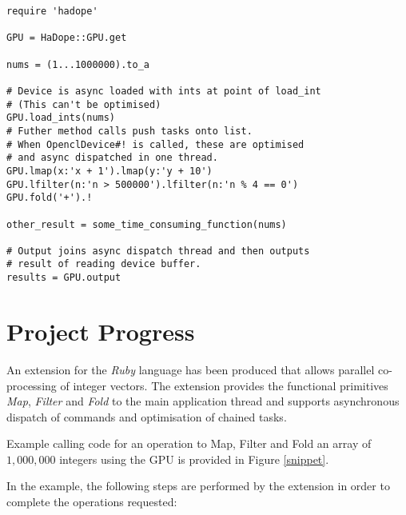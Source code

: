 \begin{figure*}
\begin{lstlisting}
require 'hadope'

GPU = HaDope::GPU.get
 
nums = (1...1000000).to_a
 
# Device is async loaded with ints at point of load_int
# (This can't be optimised)
GPU.load_ints(nums)
# Futher method calls push tasks onto list.
# When OpenclDevice#! is called, these are optimised
# and async dispatched in one thread.
GPU.lmap(x:'x + 1').lmap(y:'y + 10')
GPU.lfilter(n:'n > 500000').lfilter(n:'n % 4 == 0')
GPU.fold('+').!
 
other_result = some_time_consuming_function(nums)
 
# Output joins async dispatch thread and then outputs
# result of reading device buffer.
results = GPU.output
\end{lstlisting}
\caption{Co-processing integers in the background.}
\label{snippet}
\end{figure*}

\section{Project Progress}
  An extension for the \emph{Ruby} language has been produced that allows parallel co-processing of integer vectors. The extension provides the functional primitives \emph{Map}, \emph{Filter} and \emph{Fold} to the main application thread and supports asynchronous dispatch of commands and optimisation of chained tasks.

  Example calling code for an operation to Map, Filter and Fold an array of $1,000,000$ integers using the GPU is provided in Figure \ref{snippet}.


  In the example, the following steps are performed by the extension in order to complete the operations requested:

